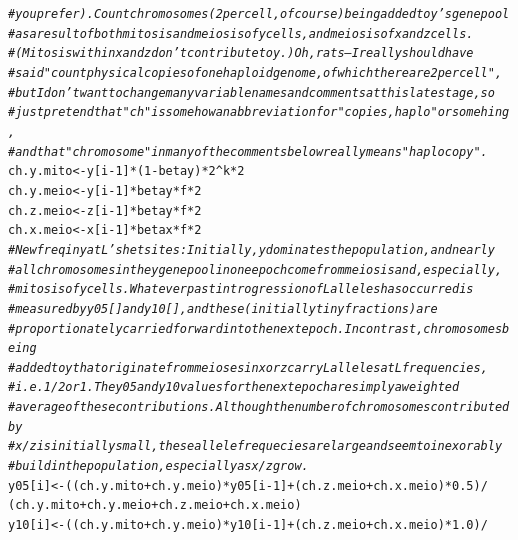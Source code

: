 \documentclass{article}\usepackage[]{graphicx}\usepackage[]{color}
\makeatletter
\newcommand{\hlnum}[1]{\textcolor[rgb]{0.686,0.059,0.569}{#1}}%
\newcommand{\hlcom}[1]{\textcolor[rgb]{0.678,0.584,0.686}{\textit{#1}}}%
\newcommand{\hlopt}[1]{\textcolor[rgb]{0,0,0}{#1}}%
\newcommand{\hlstd}[1]{\textcolor[rgb]{0.345,0.345,0.345}{#1}}%
\newcommand{\hlkwb}[1]{\textcolor[rgb]{0.69,0.353,0.396}{#1}}%
\newenvironment{kframe}{%
 \def\at@end@of@kframe{}%
 \ifinner\ifhmode%
  \def\at@end@of@kframe{\end{minipage}}%
  \begin{minipage}{\columnwidth}%
 \fi\fi%
 \def\FrameCommand##1{\hskip\@totalleftmargin \hskip-\fboxsep
 \colorbox{shadecolor}{##1}\hskip-\fboxsep
     \hskip-\linewidth \hskip-\@totalleftmargin \hskip\columnwidth}%
 \MakeFramed {\advance\hsize-\width
   \@totalleftmargin\z@ \linewidth\hsize
   \@setminipage}}%
 {\par\unskip\endMakeFramed%
 \at@end@of@kframe}
\newenvironment{knitrout}{}{} %
\makeatother
\begin{document}
\begin{knitrout}
\begin{kframe}
\begin{alltt}
    \hlcom{# you prefer). Count chromosomes (2 per cell, of course) being added to y's gene pool}
    \hlcom{# as a result of both mitosis and meiosis of y cells, and meiosis of x and z cells. }
    \hlcom{# (Mitosis within x and z don't contribute to y.)  Oh, rats -- I really should have}
    \hlcom{# said "count physical copies of one haploid genome, of which there are 2 per cell",}
    \hlcom{# but I don't want to change many variable names and comments at this late stage, so}
    \hlcom{# just pretend that "ch" is somehow an abbreviation for "copies, haplo" or somehing,}
    \hlcom{# and that "chromosome" in many of the comments below really means "haplocopy".}
    \hlstd{ch.y.mito} \hlkwb{<-} \hlstd{y[i}\hlopt{-}\hlnum{1}\hlstd{]} \hlopt{*} \hlstd{(}\hlnum{1}\hlopt{-}\hlstd{betay)} \hlopt{*} \hlnum{2}\hlopt{^}\hlstd{k} \hlopt{*} \hlnum{2}
    \hlstd{ch.y.meio} \hlkwb{<-} \hlstd{y[i}\hlopt{-}\hlnum{1}\hlstd{]} \hlopt{*} \hlstd{betay} \hlopt{*} \hlstd{f} \hlopt{*} \hlnum{2}
    \hlstd{ch.z.meio} \hlkwb{<-} \hlstd{z[i}\hlopt{-}\hlnum{1}\hlstd{]} \hlopt{*} \hlstd{betay} \hlopt{*} \hlstd{f} \hlopt{*} \hlnum{2}
    \hlstd{ch.x.meio} \hlkwb{<-} \hlstd{x[i}\hlopt{-}\hlnum{1}\hlstd{]} \hlopt{*} \hlstd{betax} \hlopt{*} \hlstd{f} \hlopt{*} \hlnum{2}
    \hlcom{# New freq in y at L's het sites: Initially, y dominates the population, and nearly}
    \hlcom{# all chromosomes in the y gene pool in one epoch come from meiosis and, especially,}
    \hlcom{# mitosis of y cells.  Whatever past introgression of L alleles has occurred is}
    \hlcom{# measured by y05[] and y10[], and these (initially tiny fractions) are}
    \hlcom{# proportionately carried forward into the next epoch.  In contrast, chromosomes being}
    \hlcom{# added to y that originate from meioses in x or z carry L alleles at L frequencies,}
    \hlcom{# i.e. 1/2 or 1.  The y05 and y10 values for the next epoch are simply a weighted}
    \hlcom{# average of these contributions.  Although the number of chromosomes contributed by}
    \hlcom{# x/z is initially small, these allele frequecies are large and seem to inexorably}
    \hlcom{# build in the population, especially as x/z grow.}
    \hlstd{y05[i]} \hlkwb{<-} \hlstd{((ch.y.mito} \hlopt{+} \hlstd{ch.y.meio)} \hlopt{*} \hlstd{y05[i}\hlopt{-}\hlnum{1}\hlstd{]} \hlopt{+} \hlstd{(ch.z.meio} \hlopt{+} \hlstd{ch.x.meio)} \hlopt{*} \hlnum{0.5}\hlstd{)} \hlopt{/}
              \hlstd{( ch.y.mito} \hlopt{+} \hlstd{ch.y.meio}             \hlopt{+}  \hlstd{ch.z.meio} \hlopt{+} \hlstd{ch.x.meio       )}
    \hlstd{y10[i]} \hlkwb{<-} \hlstd{((ch.y.mito} \hlopt{+} \hlstd{ch.y.meio)} \hlopt{*} \hlstd{y10[i}\hlopt{-}\hlnum{1}\hlstd{]} \hlopt{+} \hlstd{(ch.z.meio} \hlopt{+} \hlstd{ch.x.meio)} \hlopt{*} \hlnum{1.0}\hlstd{)} \hlopt{/}

\end{alltt}
\end{kframe}
\end{knitrout}
\end{document}
